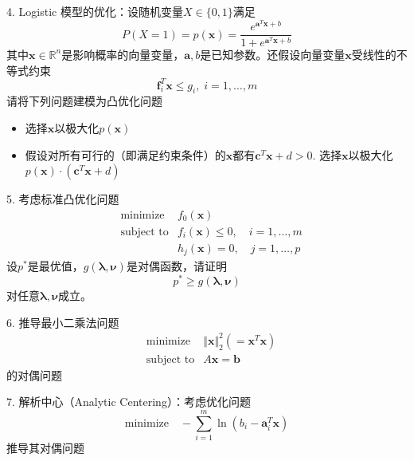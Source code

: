 
\begin{frame}

4. Logistic 模型的优化：设随机变量$X\in\{0,1\}$满足
$$P(X=1) = p(\mathbf{x}) = \dfrac{e^{\mathbf{a}^T\mathbf{x} + b}}{1 + e^{\mathbf{a}^T\mathbf{x} + b}}$$
其中$\mathbf{x} \in \mathbb{R}^n$是影响概率的向量变量，$\mathbf{a}, b$是已知参数。还假设向量变量$\mathbf{x}$受线性的不等式约束
$$\mathbf{f}_i^T\mathbf{x} \le g_i, \; i=1,\ldots,m$$
请将下列问题建模为凸优化问题
\begin{itemize}
\item[(1)] 选择$\mathbf{x}$以极大化$p(\mathbf{x})$
\item[(2)] 假设对所有可行的（即满足约束条件）的$\mathbf{x}$都有$\mathbf{c}^T\mathbf{x} + d > 0$. 选择$\mathbf{x}$以极大化$p(\mathbf{x})\cdot (\mathbf{c}^T\mathbf{x} + d)$
\end{itemize}

\end{frame}


\begin{frame}

5. 考虑标准凸优化问题
\begin{eqnarray*}
& \text{minimize} & f_0(\mathbf{x}) \\
& \text{subject to} & f_i(\mathbf{x}) \le 0, \quad i = 1,\ldots,m \\
& & h_j(\mathbf{x}) = 0, \quad j = 1,\ldots,p
\end{eqnarray*}
设$p^*$是最优值，$g(\boldsymbol\lambda, \boldsymbol\nu)$是对偶函数，请证明
$$p^* \ge g(\boldsymbol\lambda, \boldsymbol\nu)$$
对任意$\boldsymbol\lambda, \boldsymbol\nu$成立。

\end{frame}


\begin{frame}

6. 推导最小二乘法问题
\begin{eqnarray*}
& \text{minimize} & \Vert \mathbf{x} \Vert_2^2 (= \mathbf{x}^T\mathbf{x}) \\
& \text{subject to} & A\mathbf{x} = \mathbf{b}
\end{eqnarray*}
的对偶问题

\vspace{1em}

7. 解析中心（Analytic Centering）：考虑优化问题
$$\text{minimize} \quad -\sum\limits_{i=1}^m \ln(b_i - \mathbf{a}_i^T\mathbf{x})$$
推导其对偶问题

\end{frame}

